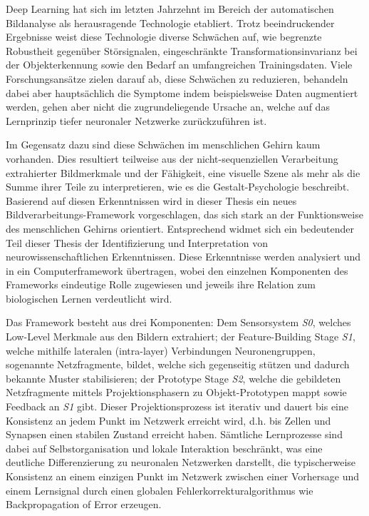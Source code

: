 Deep Learning hat sich im letzten Jahrzehnt im Bereich der automatischen Bildanalyse als herausragende Technologie etabliert.
Trotz beeindruckender Ergebnisse weist diese Technologie diverse Schwächen auf, wie begrenzte Robustheit gegenüber Störsignalen, eingeschränkte Transformationsinvarianz bei der Objekterkennung sowie den Bedarf an umfangreichen Trainingsdaten.
Viele Forschungsansätze zielen darauf ab, diese Schwächen zu reduzieren, behandeln dabei aber hauptsächlich die Symptome indem beispielsweise Daten augmentiert werden, gehen aber nicht die zugrundeliegende Ursache an, welche auf das Lernprinzip tiefer neuronaler Netzwerke zurückzuführen ist.

Im Gegensatz dazu sind diese Schwächen im menschlichen Gehirn kaum vorhanden.
Dies resultiert teilweise aus der nicht-sequenziellen Verarbeitung extrahierter Bildmerkmale und der Fähigkeit, eine visuelle Szene als mehr als die Summe ihrer Teile zu interpretieren, wie es die Gestalt-Psychologie beschreibt.
Basierend auf diesen Erkenntnissen wird in dieser Thesis ein neues Bildverarbeitungs-Framework vorgeschlagen, das sich stark an der Funktionsweise des menschlichen Gehirns orientiert.
Entsprechend widmet sich ein bedeutender Teil dieser Thesis der Identifizierung und Interpretation von neurowissenschaftlichen Erkenntnissen.
Diese Erkenntnisse werden analysiert und in ein Computerframework übertragen, wobei den einzelnen Komponenten des Frameworks eindeutige Rolle zugewiesen und jeweils ihre Relation zum biologischen Lernen verdeutlicht wird.

Das Framework besteht aus drei Komponenten: Dem Sensorsystem \emph{S0}, welches Low-Level Merkmale aus den Bildern extrahiert; der Feature-Building Stage \emph{S1}, welche mithilfe lateralen (intra-layer) Verbindungen Neuronengruppen, sogenannte Netzfragmente, bildet, welche sich gegenseitig stützen und dadurch bekannte Muster stabilisieren; der Prototype Stage \emph{S2}, welche die gebildeten Netzfragmente  mittels Projektionsphasern zu Objekt-Prototypen mappt sowie Feedback an \emph{S1} gibt.
Dieser Projektionsprozess ist iterativ und dauert bis eine Konsistenz an jedem Punkt im Netzwerk erreicht wird, d.h. bis Zellen und Synapsen einen stabilen Zustand erreicht haben.
Sämtliche Lernprozesse sind dabei auf Selbstorganisation und lokale Interaktion beschränkt, was eine deutliche Differenzierung zu neuronalen Netzwerken darstellt, die typischerweise Konsistenz an einem einzigen Punkt im Netzwerk zwischen einer Vorhersage und einem Lernsignal durch einen globalen Fehlerkorrekturalgorithmus wie Backpropagation of Error erzeugen.

